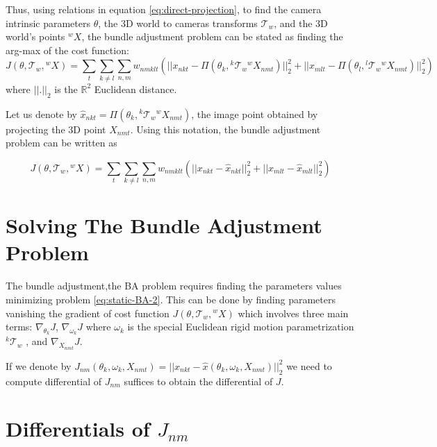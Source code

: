 \documentclass{article}
\begin{document}
Thus, using relations in equation \eqref{eq:direct-projection}, to find the camera intrinsic parameters $\theta$, the 3D world to cameras transforms $\mathcal{T}_w$, and the 3D world's points ${}^wX$, the bundle adjustment problem can be stated as finding the arg-max of the cost function:
\begin{equation}\label{eq:static-BA}
J(\theta,\mathcal{T}_w,{}^wX) = \sum_{t} \sum_{k \neq l} \sum_{n,m}  w_{nmklt}\left(||x_{nkt} - \Pi(\theta_k, {}^k\mathcal{T}_w {}^wX_{nmt})||_2^2 +||x_{mlt} - \Pi(\theta_l, {}^l\mathcal{T}_w {}^wX_{nmt})||_2^2  \right)
\end{equation}
where $||.||_2$ is the $\mathbb{R}^2$ Euclidean distance.

Let us denote by $\hat{x}_{nkt} = \Pi(\theta_k, {}^k\mathcal{T}_w {}^wX_{nmt})$, the image point obtained by projecting the 3D point $X_{nmt}$. %
%
Using this notation, the bundle adjustment problem can be written as

\begin{equation}\label{eq:static-BA-2}
J(\theta,\mathcal{T}_w,{}^wX) = \sum_{t} \sum_{k \neq l} \sum_{n,m}  w_{nmklt}\left(||x_{nkt} - \hat{x}_{nkt}||_2^2 +||x_{mlt} - \hat{x}_{mlt}||_2^2  \right)
\end{equation}


\section{Solving The Bundle Adjustment Problem}

The bundle adjustment,the BA problem requires finding the parameters values minimizing problem \eqref{eq:static-BA-2}. This can be done by finding parameters vanishing the gradient of cost function $J(\theta,\mathcal{T}_w,{}^wX)$ which involves three main terms: $\nabla_{\theta_k}J$, $\nabla_{\omega_k}J$ where $\omega_k$ is the special Euclidean  rigid motion parametrization ${}^k\mathcal{T}_w$ , and $\nabla_{X_{nmt}}J$.

If we denote by 
$
J_{nm}(\theta_k,\omega_k,X_{nmt}) = ||x_{nkt} - \hat{x}(\theta_k,\omega_k,X_{nmt})||_2^2
$
we need to compute differential of $J_{nm}$ suffices to obtain the differential of $J$.

\section{Differentials of $J_{nm}$}
\end{document}
